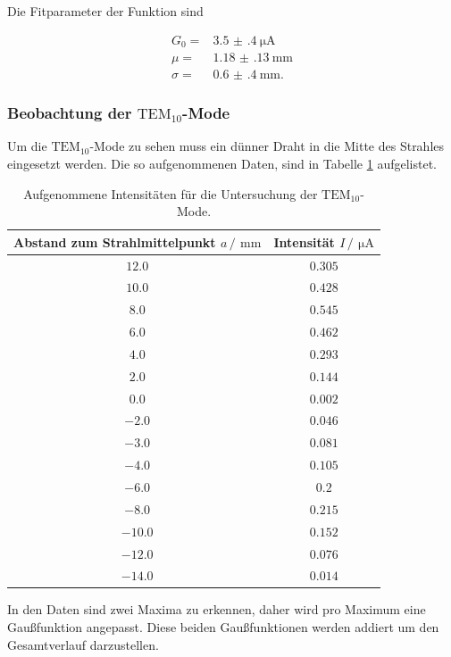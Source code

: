 Die Fitparameter der Funktion sind

\begin{align*}
  G_{0}=&\SI{3.5(4)}{\micro\ampere}\\
  \mu =& \SI{1.18(13)}{\milli\meter}\\
  \sigma =& \SI{0.6(4)}{\milli\meter}.
\end{align*}

\subsubsection{Beobachtung der \texorpdfstring{$\text{TEM}_{10}$}{T1}-Mode}

Um die $\text{TEM}_{10}$-Mode zu sehen muss ein dünner Draht in die Mitte des Strahles eingesetzt werden. Die 
so aufgenommenen Daten, sind in Tabelle \ref{tab:TEM01} aufgelistet.

\begin{table}
  \centering
  \caption{Aufgenommene Intensitäten für die Untersuchung der $\text{TEM}_{10}$-Mode.}
  \label{tab:TEM01}
  \begin{tabular}{c c}
    \toprule
    Abstand zum Strahlmittelpunkt $a\,/\,\SI{}{\milli\meter}$&Intensität $I \,/\,\SI{}{\micro\ampere}$\\
    \midrule
    $\num{12.0}$&$\num{0.305}$\\
    $\num{10.0}$&$\num{0.428}$\\
    $\num{8.0}$&$\num{0.545}$\\
    $\num{6.0}$&$\num{0.462}$\\
    $\num{4.0}$&$\num{0.293}$\\
    $\num{2.0}$&$\num{0.144}$\\
    $\num{0.0}$&$\num{0.002}$\\
    $\num{-2.0}$&$\num{0.046}$\\
    $\num{-3.0}$&$\num{0.081}$\\
    $\num{-4.0}$&$\num{0.105}$\\
    $\num{-6.0}$&$\num{0.2}$\\
    $\num{-8.0}$&$\num{0.215}$\\
    $\num{-10.0}$&$\num{0.152}$\\
    $\num{-12.0}$&$\num{0.076}$\\
    $\num{-14.0}$&$\num{0.014}$\\
    \bottomrule
  \end{tabular}
\end{table}
\FloatBarrier

In den Daten sind zwei Maxima zu erkennen, daher wird pro Maximum eine Gaußfunktion angepasst. Diese beiden Gaußfunktionen werden
addiert um den Gesamtverlauf darzustellen.

